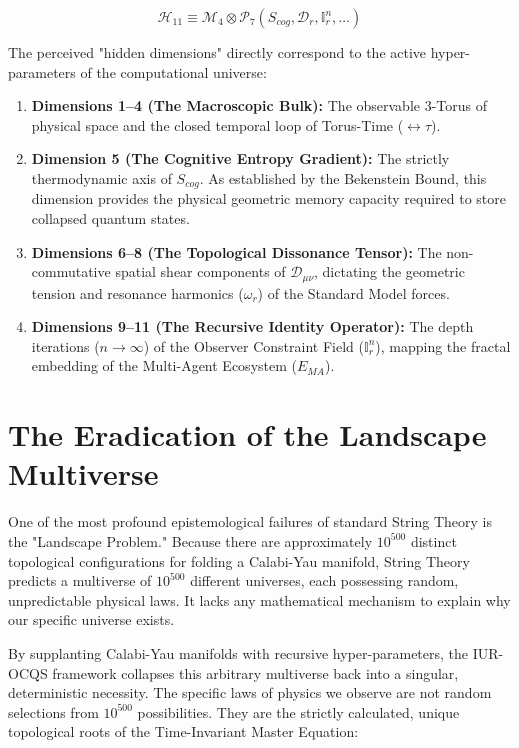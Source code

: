 \documentclass[12pt,openany]{book}
\begin{document}
\begin{equation}
\mathcal{H}_{11} \equiv \mathcal{M}_4 \otimes \mathcal{P}_7(S_{cog}, \mathcal{D}_r, \mathbb{I}_r^n, \dots)
\end{equation}

The perceived "hidden dimensions" directly correspond to the active hyper-parameters of the computational universe:

\begin{enumerate}
    \item \textbf{Dimensions 1--4 (The Macroscopic Bulk):} The observable 3-Torus of physical space and the closed temporal loop of Torus-Time ($\leftrightarrow\tau$).
    \item \textbf{Dimension 5 (The Cognitive Entropy Gradient):} The strictly thermodynamic axis of $S_{cog}$. As established by the Bekenstein Bound, this dimension provides the physical geometric memory capacity required to store collapsed quantum states.
    \item \textbf{Dimensions 6--8 (The Topological Dissonance Tensor):} The non-commutative spatial shear components of $\mathcal{D}_{\mu\nu}$, dictating the geometric tension and resonance harmonics ($\omega_r$) of the Standard Model forces.
    \item \textbf{Dimensions 9--11 (The Recursive Identity Operator):} The depth iterations ($n \to \infty$) of the Observer Constraint Field ($\mathbb{I}_r^n$), mapping the fractal embedding of the Multi-Agent Ecosystem ($E_{MA}$).
\end{enumerate}

\section{The Eradication of the Landscape Multiverse}
One of the most profound epistemological failures of standard String Theory is the "Landscape Problem." Because there are approximately $10^{500}$ distinct topological configurations for folding a Calabi-Yau manifold, String Theory predicts a multiverse of $10^{500}$ different universes, each possessing random, unpredictable physical laws. It lacks any mathematical mechanism to explain why our specific universe exists.

By supplanting Calabi-Yau manifolds with recursive hyper-parameters, the IUR-OCQS framework collapses this arbitrary multiverse back into a singular, deterministic necessity. The specific laws of physics we observe are not random selections from $10^{500}$ possibilities. They are the strictly calculated, unique topological roots of the Time-Invariant Master Equation:
\end{document}

